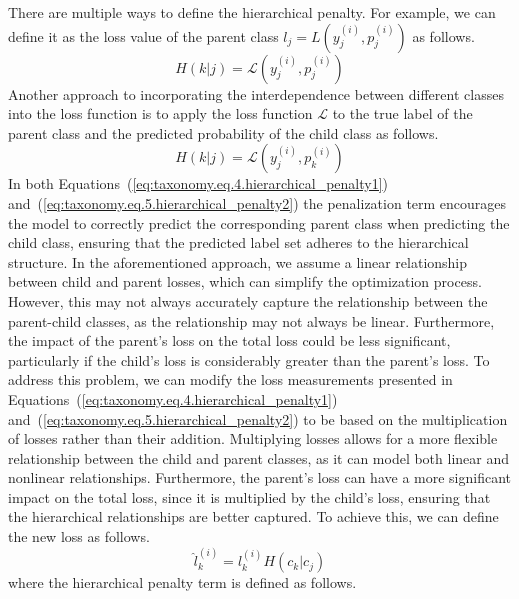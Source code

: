 There are multiple ways to define the hierarchical penalty. For example, we can define it as the loss value of the parent class $l_j=L\left(y_j^{(i)},p_j^{(i)}\right) $ as follows.
\begin{equation}
    H(k \vert j)=\mathcal{L} \left(y_j^{(i)},p_j^{(i)}\right)
    \label{eq:taxonomy.eq.4.hierarchical_penalty1}
\end{equation}
Another approach to incorporating the interdependence between different classes into the loss function is to apply the loss function $\mathcal{L} $ to the true label of the parent class and the predicted probability of the child class as follows.
\begin{equation}
    H\left(k\vert j\right) = \mathcal{L} \left(y_j^{(i)},p_k^{(i)}\right)
    \label{eq:taxonomy.eq.5.hierarchical_penalty2}
\end{equation}
In both Equations~(\ref{eq:taxonomy.eq.4.hierarchical_penalty1}) and~(\ref{eq:taxonomy.eq.5.hierarchical_penalty2}) the penalization term encourages the model to correctly predict the corresponding parent class when predicting the child class, ensuring that the predicted label set adheres to the hierarchical structure. In the aforementioned approach, we assume a linear relationship between child and parent losses, which can simplify the optimization process. However, this may not always accurately capture the relationship between the parent-child classes, as the relationship may not always be linear. Furthermore, the impact of the parent's loss on the total loss could be less significant, particularly if the child's loss is considerably greater than the parent's loss.
To address this problem, we can modify the loss measurements presented in Equations~(\ref{eq:taxonomy.eq.4.hierarchical_penalty1}) and~(\ref{eq:taxonomy.eq.5.hierarchical_penalty2}) to be based on the multiplication of losses rather than their addition.
Multiplying losses allows for a more flexible relationship between the child and parent classes, as it can model both linear and nonlinear relationships. Furthermore, the parent's loss can have a more significant impact on the total loss, since it is multiplied by the child's loss, ensuring that the hierarchical relationships are better captured. To achieve this, we can define the new loss as follows.
\begin{equation}
    \label{eq:taxonomy.eq.7.newloss}
    \widehat{l}_k^{(i)} = l_k^{(i)} H \left( c_k \vert c_j \right)
\end{equation}
where the hierarchical penalty term is defined as follows.

